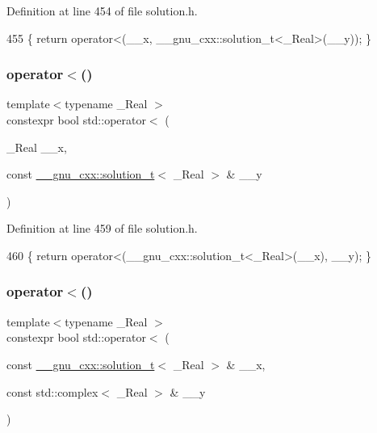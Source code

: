 Definition at line 454 of file solution.\+h.


\begin{DoxyCode}
455     \{ \textcolor{keywordflow}{return} operator<(\_\_x, \_\_gnu\_cxx::solution\_t<\_Real>(\_\_y)); \}
\end{DoxyCode}
\mbox{\label{namespacestd_a183c95d9119b28c67d257989db658fdb}} 
\subsubsection{\texorpdfstring{operator$<$()}{operator<()}\hspace{0.1cm}{\footnotesize\ttfamily [3/5]}}
{\footnotesize\ttfamily template$<$typename \+\_\+\+Real $>$ \\
constexpr bool std\+::operator$<$ (\begin{DoxyParamCaption}\item[{\+\_\+\+Real}]{\+\_\+\+\_\+x,  }\item[{const \hyperlink{namespace____gnu__cxx_ae20ea642de50eb361074c62676b0159c}{\+\_\+\+\_\+gnu\+\_\+cxx\+::solution\+\_\+t}$<$ \+\_\+\+Real $>$ \&}]{\+\_\+\+\_\+y }\end{DoxyParamCaption})}



Definition at line 459 of file solution.\+h.


\begin{DoxyCode}
460     \{ \textcolor{keywordflow}{return} operator<(\_\_gnu\_cxx::solution\_t<\_Real>(\_\_x), \_\_y); \}
\end{DoxyCode}
\mbox{\label{namespacestd_a4586465c3d71c8a977bb56c06c604eab}} 
\subsubsection{\texorpdfstring{operator$<$()}{operator<()}\hspace{0.1cm}{\footnotesize\ttfamily [4/5]}}
{\footnotesize\ttfamily template$<$typename \+\_\+\+Real $>$ \\
constexpr bool std\+::operator$<$ (\begin{DoxyParamCaption}\item[{const \hyperlink{namespace____gnu__cxx_ae20ea642de50eb361074c62676b0159c}{\+\_\+\+\_\+gnu\+\_\+cxx\+::solution\+\_\+t}$<$ \+\_\+\+Real $>$ \&}]{\+\_\+\+\_\+x,  }\item[{const std\+::complex$<$ \+\_\+\+Real $>$ \&}]{\+\_\+\+\_\+y }\end{DoxyParamCaption})}



